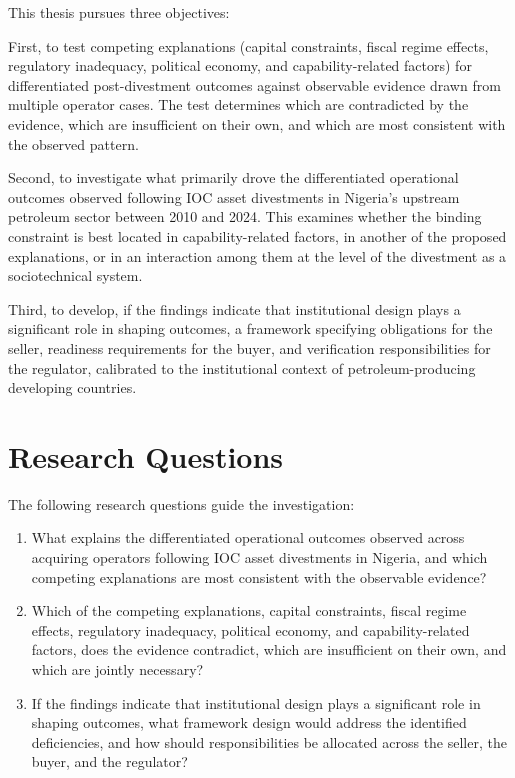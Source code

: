 \documentclass[twoside,fontset=lmodern]{mitthesis}
\begin{document}
This thesis pursues three objectives:

First, to test competing explanations (capital constraints, fiscal
regime effects, regulatory inadequacy, political economy, and
capability-related factors) for differentiated post-divestment outcomes
against observable evidence drawn from multiple operator cases. The test
determines which are contradicted by the evidence, which are
insufficient on their own, and which are most consistent with the
observed pattern.

Second, to investigate what primarily drove the differentiated
operational outcomes observed following IOC asset divestments in
Nigeria's upstream petroleum sector between 2010 and 2024. This examines
whether the binding constraint is best located in capability-related
factors, in another of the proposed explanations, or in an interaction
among them at the level of the divestment as a sociotechnical system.

Third, to develop, if the findings indicate that institutional design
plays a significant role in shaping outcomes, a framework specifying
obligations for the seller, readiness requirements for the buyer, and
verification responsibilities for the regulator, calibrated to the
institutional context of petroleum-producing developing countries.

\hypertarget{research-questions}{%
\section{Research Questions}\label{research-questions}}

The following research questions guide the investigation:

\begin{enumerate}
\def\labelenumi{\arabic{enumi}.}
\item
  What explains the differentiated operational outcomes observed across
  acquiring operators following IOC asset divestments in Nigeria, and
  which competing explanations are most consistent with the observable
  evidence?
\item
  Which of the competing explanations, capital constraints, fiscal
  regime effects, regulatory inadequacy, political economy, and
  capability-related factors, does the evidence contradict, which are
  insufficient on their own, and which are jointly necessary?
\item
  If the findings indicate that institutional design plays a significant
  role in shaping outcomes, what framework design would address the
  identified deficiencies, and how should responsibilities be allocated
  across the seller, the buyer, and the regulator?
\end{enumerate}
\end{document}
